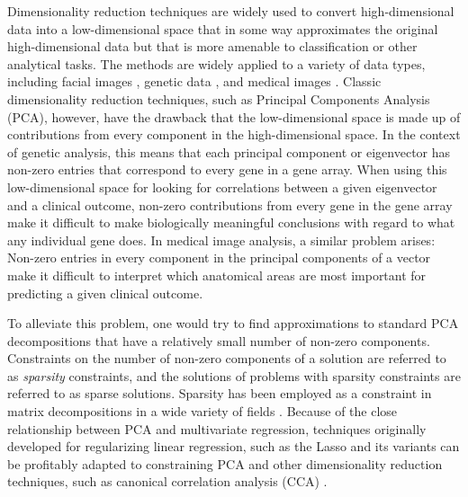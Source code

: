 \documentclass[11pt]{nih}
\begin{document}
Dimensionality reduction techniques are widely used to convert high-dimensional data into a low-dimensional space that in some way approximates the original high-dimensional data but that is more amenable to classification or other analytical tasks.  The methods are widely applied to a variety of data types, including facial images \cite{turk_eigenfaces_1991,belhumeur_eigenfaces_1997}, genetic data \cite{holter_fundamental_2000,yeung_principal_2001,alter_singular_2000,zou_sparse_2006,witten_penalized_2009}, and  medical images \cite{teipel_multivariate_2007}.  Classic dimensionality reduction techniques, such as Principal Components Analysis (PCA), however, have the drawback that the low-dimensional space is made up of contributions from every component in the high-dimensional space.  In the context of genetic analysis, this means that each principal component or eigenvector has non-zero entries that correspond to every gene in a gene array.  When using this low-dimensional space for looking for correlations between a given eigenvector and a clinical outcome, non-zero contributions from every gene in the gene array make it difficult to make biologically meaningful conclusions with regard to what any individual gene does.  In medical image analysis, a similar problem arises:  Non-zero entries in every  component in the principal components of a vector make it difficult to interpret which anatomical areas are most important for predicting a given clinical outcome.  

To alleviate this problem, one would try to find approximations to standard PCA decompositions that have a relatively small number of non-zero components.  Constraints on the number of non-zero components of a solution are referred to as \textit{sparsity} constraints, and the solutions of problems with sparsity constraints are referred to as sparse solutions.  Sparsity has been employed as a constraint in matrix decompositions in a wide variety of fields \cite{levy_reconstruction_1981,candes_robust_2006,zou_sparse_2006,sjostrand_sparse_2007,zhang_deformable_2011,witten_penalized_2009,zou_sparse_2006,jolliffe_simplified_2000,jolliffe_modified_2003,hoyer_non-negative_2004,batmanghelich_general_2009,batmanghelich_regularized_2011}.  Because of the close relationship between PCA and multivariate regression, techniques originally developed for regularizing linear regression, such as the Lasso and its variants \cite{tibshirani_regression_1996,tibshirani_sparsity_2005} can be profitably adapted to constraining PCA and other dimensionality reduction techniques, such as canonical correlation analysis (CCA) \cite{witten_extensions_2009}. 
\end{document}
